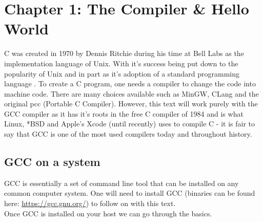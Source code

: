 \section{Chapter 1: The Compiler \& Hello World}
C was created in 1970 by Dennis Ritchie during his time at Bell Labs as the implementation language of Unix. With it's success being put down to the popularity of Unix and in part as it's adoption of a standard programming language \cite{cHist}. To create a C program, one needs a compiler to change the code into machine code. There are many choices available such as MinGW, CLang and the original pcc (Portable C Compiler). However, this text will work purely with the GCC compiler as it has it's roots in the free C compiler of 1984 and is what Linux, *BSD and Apple's Xcode (until recently) uses to compile C - it is fair to say that GCC is one of the most used compilers today and throughout history.\\
\subsection{GCC on a system}
GCC is essentially a set of command line tool that can be installed on any common computer system. One will need to install GCC (binaries can be found here: \url{https://gcc.gnu.org/}) to follow on with this text.\\
Once GCC is installed on your host we can go through the basics.\\


